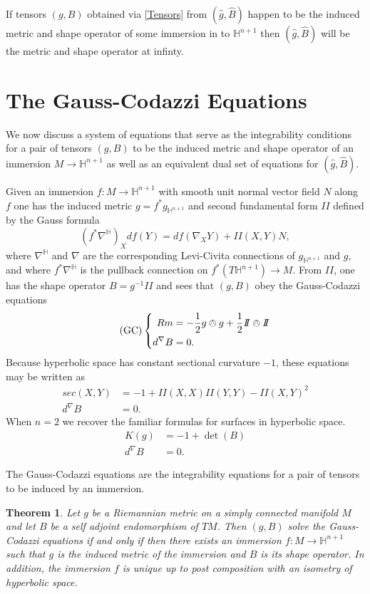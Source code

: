 \documentclass{amsart}
\newcommand{\two}{I\!\!I}
\newtheorem{thm}{Theorem}[section]
\numberwithin{equation}{section}
\renewcommand{\H}{\mathbb{H}}
\begin{document}
If tensors $(g,B)$ obtained via \eqref{Tensors} from $(\hat{g},\hat{B})$ happen to be the induced metric and shape operator of some immersion in to $\H^{n+1}$ then $(\hat{g},\hat{B})$ will be the metric and shape operator at infinty. 


\section{The Gauss-Codazzi Equations}
We now discuss a system of equations that serve as the integrability conditions for a pair of tensors $(g,B)$ to be the induced metric and shape operator of an immersion $M \to \H^{n+1}$ as well as an equivalent dual set of equations for $(\hat{g},\hat{B})$.

Given an immersion $f: M \to \H^{n+1}$ with smooth unit normal vector field $N$ along $f$ one has the induced metric $g = f^*g_{\H^{n+1}}$ and second fundamental form $\two$ defined by the Gauss formula
\[
(f^*\nabla^{\H})_Xdf(Y) = df(\nabla_XY) + \two(X,Y)N,
\]
where $\nabla^\H$ and $\nabla$ are the corresponding Levi-Civita connections of $g_{\H^{n+1}}$ and $g$, and where $f^*\nabla^\H$ is the pullback connection on $f^*(T\H^{n+1}) \to M$.
From $\two$, one has the shape operator $B = g^{-1}\two$ and sees that $(g,B)$ obey the Gauss-Codazzi equations
\begin{equation}
\label{GC} \tag{GC}
\left\{
\begin{aligned}
Rm &= -\frac{1}{2}g \owedge g + \frac{1}{2}\two \owedge \two \\
d^\nabla B &= 0.
\end{aligned}
\right.
\end{equation}
Because hyperbolic space has constant sectional curvature $-1$, these equations may be written as
\begin{align*}
sec(X,Y) &= -1 + \two(X,X)\two(Y,Y) - \two(X,Y)^2 \\
d^\nabla B &= 0.
\end{align*}
When $n = 2$ we recover the familiar formulas for surfaces in hyperbolic space. 
\begin{align*}
K(g) &= -1 + \det(B) \\
d^\nabla B &= 0. 
\end{align*}

The Gauss-Codazzi equations are the integrability equations for a pair of tensors to be induced by an immersion.

\begin{thm}
Let $g$ be a Riemannian metric on a simply connected manifold $M$ and let $B$ be a self adjoint endomorphism of $TM$. 
Then $(g,B)$ solve the Gauss-Codazzi equations if and only if then there exists an immersion $f: M \to \H^{n+1}$ such that $g$ is the induced metric of the immersion and $B$ is its shape operator. 
In addition, the immersion $f$ is unique up to post composition with an isometry of hyperbolic space. 
\end{thm}
\end{document}
